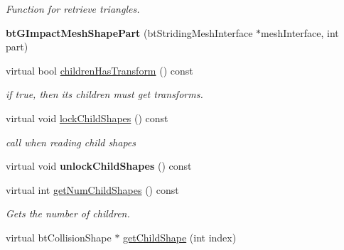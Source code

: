 \begin{DoxyCompactItemize}
\begin{DoxyCompactList}\small\item\em Function for retrieve triangles. \end{DoxyCompactList}\item 
\mbox{\label{classbtGImpactMeshShapePart_a2e3ad6d2af64c321af6ce23e16aa2828}} 
{\bfseries bt\+G\+Impact\+Mesh\+Shape\+Part} (bt\+Striding\+Mesh\+Interface $\ast$mesh\+Interface, int part)
\item 
\mbox{\label{classbtGImpactMeshShapePart_abef102fb9c45e2361e669febee12c0fa}} 
virtual bool \hyperlink{classbtGImpactMeshShapePart_abef102fb9c45e2361e669febee12c0fa}{children\+Has\+Transform} () const
\begin{DoxyCompactList}\small\item\em if true, then its children must get transforms. \end{DoxyCompactList}\item 
\mbox{\label{classbtGImpactMeshShapePart_a4519e7264ea6706494ebf3a14c8ae7b9}} 
virtual void \hyperlink{classbtGImpactMeshShapePart_a4519e7264ea6706494ebf3a14c8ae7b9}{lock\+Child\+Shapes} () const
\begin{DoxyCompactList}\small\item\em call when reading child shapes \end{DoxyCompactList}\item 
\mbox{\label{classbtGImpactMeshShapePart_a94ab5cef0d8917b442618bba2ac8f054}} 
virtual void {\bfseries unlock\+Child\+Shapes} () const
\item 
\mbox{\label{classbtGImpactMeshShapePart_a7194568862ec4430cb9f93a182215f88}} 
virtual int \hyperlink{classbtGImpactMeshShapePart_a7194568862ec4430cb9f93a182215f88}{get\+Num\+Child\+Shapes} () const
\begin{DoxyCompactList}\small\item\em Gets the number of children. \end{DoxyCompactList}\item 
\mbox{\label{classbtGImpactMeshShapePart_a9dfb2b28e136ec3b08127f6b47cefb89}} 
virtual bt\+Collision\+Shape $\ast$ \hyperlink{classbtGImpactMeshShapePart_a9dfb2b28e136ec3b08127f6b47cefb89}{get\+Child\+Shape} (int index)

\end{DoxyCompactItemize}
